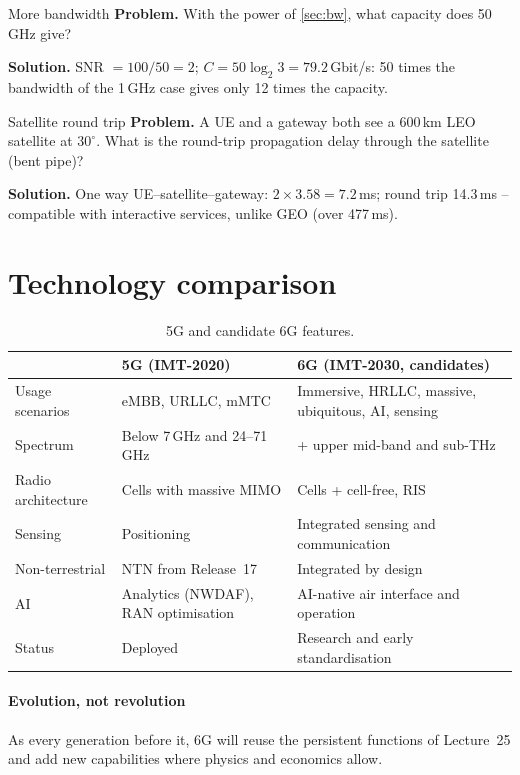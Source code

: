 \documentclass[11pt,a4paper]{article}
\begin{document}
\begin{examplebox}{More bandwidth}\label{ex:bw}
\textbf{Problem.} With the power of \cref{sec:bw}, what capacity does 50\,GHz give?

\textbf{Solution.} SNR $= 100/50 = 2$; $C = 50\log_2 3 = 79.2$\,Gbit/s: 50 times the bandwidth of the 1\,GHz case gives only 12 times the capacity.
\end{examplebox}

\begin{examplebox}{Satellite round trip}\label{ex:leo}
\textbf{Problem.} A UE and a gateway both see a 600\,km LEO satellite at $30^\circ$. What is the round-trip propagation delay through the satellite (bent pipe)?

\textbf{Solution.} One way UE--satellite--gateway: $2\times3.58 = 7.2$\,ms; round trip 14.3\,ms -- compatible with interactive services, unlike GEO (over 477\,ms).
\end{examplebox}

\section{Technology comparison}
\begin{table}[htbp]
\centering\small
\caption{5G and candidate 6G features.}\label{tab:cmp}
\begin{tabularx}{\linewidth}{@{}l Y Y@{}}
\toprule
{} & 5G (IMT-2020) & 6G (IMT-2030, candidates) \\
\midrule
Usage scenarios & eMBB, URLLC, mMTC & Immersive, HRLLC, massive, ubiquitous, AI, sensing \\
Spectrum & Below 7\,GHz and 24--71\,GHz & + upper mid-band and sub-THz \\
Radio architecture & Cells with massive MIMO & Cells + cell-free, RIS \\
Sensing & Positioning & Integrated sensing and communication \\
Non-terrestrial & NTN from Release~17 & Integrated by design \\
AI & Analytics (NWDAF), RAN optimisation & AI-native air interface and operation \\
Status & Deployed & Research and early standardisation \\
\bottomrule
\end{tabularx}
\end{table}

\paragraph{Evolution, not revolution} As every generation before it, 6G will reuse the persistent functions of Lecture~25 and add new
capabilities where physics and economics allow.
\end{document}
